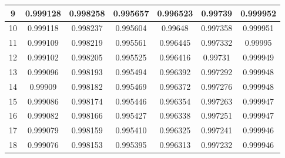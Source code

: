 \begin{table}[h]
\begin{tabular}{|l|l|l|l|l|l|l|}
\multicolumn{1}{|c|}{9} & \multicolumn{1}{c|}{0.999128} & \multicolumn{1}{c|}{0.998258} & \multicolumn{1}{c|}{0.995657} & \multicolumn{1}{c|}{0.996523} & \multicolumn{1}{c|}{0.99739} & \multicolumn{1}{c|}{0.999952} \\ 
\hline
\multicolumn{1}{|c|}{10} & \multicolumn{1}{c|}{0.999118} & \multicolumn{1}{c|}{0.998237} & \multicolumn{1}{c|}{0.995604} & \multicolumn{1}{c|}{0.99648} & \multicolumn{1}{c|}{0.997358} & \multicolumn{1}{c|}{0.999951} \\ 
\hline
\multicolumn{1}{|c|}{11} & \multicolumn{1}{c|}{0.999109} & \multicolumn{1}{c|}{0.998219} & \multicolumn{1}{c|}{0.995561} & \multicolumn{1}{c|}{0.996445} & \multicolumn{1}{c|}{0.997332} & \multicolumn{1}{c|}{0.99995} \\ 
\hline
\multicolumn{1}{|c|}{12} & \multicolumn{1}{c|}{0.999102} & \multicolumn{1}{c|}{0.998205} & \multicolumn{1}{c|}{0.995525} & \multicolumn{1}{c|}{0.996416} & \multicolumn{1}{c|}{0.99731} & \multicolumn{1}{c|}{0.999949} \\ 
\hline
\multicolumn{1}{|c|}{13} & \multicolumn{1}{c|}{0.999096} & \multicolumn{1}{c|}{0.998193} & \multicolumn{1}{c|}{0.995494} & \multicolumn{1}{c|}{0.996392} & \multicolumn{1}{c|}{0.997292} & \multicolumn{1}{c|}{0.999948} \\ 
\hline
\multicolumn{1}{|c|}{14} & \multicolumn{1}{c|}{0.99909} & \multicolumn{1}{c|}{0.998182} & \multicolumn{1}{c|}{0.995469} & \multicolumn{1}{c|}{0.996372} & \multicolumn{1}{c|}{0.997276} & \multicolumn{1}{c|}{0.999948} \\ 
\hline
\multicolumn{1}{|c|}{15} & \multicolumn{1}{c|}{0.999086} & \multicolumn{1}{c|}{0.998174} & \multicolumn{1}{c|}{0.995446} & \multicolumn{1}{c|}{0.996354} & \multicolumn{1}{c|}{0.997263} & \multicolumn{1}{c|}{0.999947} \\ 
\hline
\multicolumn{1}{|c|}{16} & \multicolumn{1}{c|}{0.999082} & \multicolumn{1}{c|}{0.998166} & \multicolumn{1}{c|}{0.995427} & \multicolumn{1}{c|}{0.996338} & \multicolumn{1}{c|}{0.997251} & \multicolumn{1}{c|}{0.999947} \\ 
\hline
\multicolumn{1}{|c|}{17} & \multicolumn{1}{c|}{0.999079} & \multicolumn{1}{c|}{0.998159} & \multicolumn{1}{c|}{0.995410} & \multicolumn{1}{c|}{0.996325} & \multicolumn{1}{c|}{0.997241} & \multicolumn{1}{c|}{0.999946} \\ 
\hline
\multicolumn{1}{|c|}{18} & \multicolumn{1}{c|}{0.999076} & \multicolumn{1}{c|}{0.998153} & \multicolumn{1}{c|}{0.995395} & \multicolumn{1}{c|}{0.996313} & \multicolumn{1}{c|}{0.997232} & \multicolumn{1}{c|}{0.999946} \\ 

\end{tabular}
\end{table}
